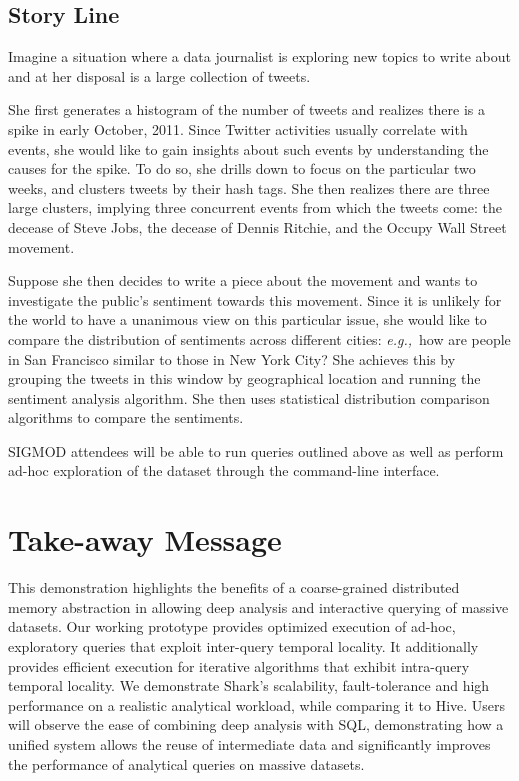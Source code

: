 \documentclass[preprint]{acm_proc_article-sp}
\newcommand{\eg}{{\em e.g.,}~}
\begin{document}
\subsection{Story Line}

Imagine a situation where a data journalist is exploring new topics to write about and at her disposal is a large collection of tweets.

She first generates a histogram of the number of tweets and realizes there is a spike in early October, 2011. Since Twitter activities usually correlate with events, she would like to gain insights about such events by understanding the causes for the spike. To do so, she drills down to focus on the particular two weeks, and clusters tweets by their hash tags. She then realizes there are three large clusters, implying three concurrent events from which the tweets come: the decease of Steve Jobs, the decease of Dennis Ritchie, and the Occupy Wall Street movement.

Suppose she then decides to write a piece about the movement and wants to investigate the public's sentiment towards this movement. Since it is unlikely for the world to have a unanimous view on this particular issue, she would like to compare the distribution of sentiments across different cities: \eg how are people in San Francisco similar to those in New York City? She achieves this by grouping the tweets in this window by geographical location and running the sentiment analysis algorithm. She then uses statistical distribution comparison algorithms to compare the sentiments.

SIGMOD attendees will be able to run queries outlined above as well as perform ad-hoc exploration of the dataset through the command-line interface.

\section{Take-away Message}
This demonstration highlights the benefits of a coarse-grained distributed memory abstraction in allowing deep analysis and interactive querying of massive datasets. Our working prototype provides optimized execution of ad-hoc, exploratory queries that exploit inter-query temporal locality. It additionally provides efficient execution for iterative algorithms that exhibit intra-query temporal locality. We demonstrate Shark's scalability, fault-tolerance and high performance on a realistic analytical workload, while comparing it to Hive. Users will observe the ease of combining deep analysis with SQL, demonstrating how a unified system allows the reuse of intermediate data and significantly improves the performance of analytical queries on massive datasets.
\end{document}
